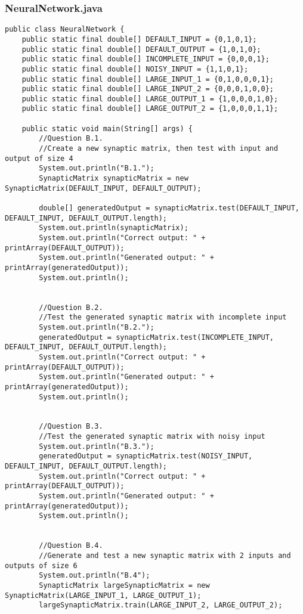 \documentclass{article}
\begin{document}
\subsubsection*{NeuralNetwork.java}
\begin{lstlisting}
public class NeuralNetwork {
	public static final double[] DEFAULT_INPUT = {0,1,0,1};
	public static final double[] DEFAULT_OUTPUT = {1,0,1,0};
	public static final double[] INCOMPLETE_INPUT = {0,0,0,1};
	public static final double[] NOISY_INPUT = {1,1,0,1};
	public static final double[] LARGE_INPUT_1 = {0,1,0,0,0,1};
	public static final double[] LARGE_INPUT_2 = {0,0,0,1,0,0};
	public static final double[] LARGE_OUTPUT_1 = {1,0,0,0,1,0};
	public static final double[] LARGE_OUTPUT_2 = {1,0,0,0,1,1};
	
	public static void main(String[] args) {
		//Question B.1.
		//Create a new synaptic matrix, then test with input and output of size 4
		System.out.println("B.1.");
		SynapticMatrix synapticMatrix = new SynapticMatrix(DEFAULT_INPUT, DEFAULT_OUTPUT);
		
		double[] generatedOutput = synapticMatrix.test(DEFAULT_INPUT, DEFAULT_INPUT, DEFAULT_OUTPUT.length);
		System.out.println(synapticMatrix);
		System.out.println("Correct output: " + printArray(DEFAULT_OUTPUT));
		System.out.println("Generated output: " + printArray(generatedOutput));
		System.out.println();
		

		//Question B.2.
		//Test the generated synaptic matrix with incomplete input
		System.out.println("B.2.");
		generatedOutput = synapticMatrix.test(INCOMPLETE_INPUT, DEFAULT_INPUT, DEFAULT_OUTPUT.length);
		System.out.println("Correct output: " + printArray(DEFAULT_OUTPUT));
		System.out.println("Generated output: " + printArray(generatedOutput));
		System.out.println();
		
		
		//Question B.3.
		//Test the generated synaptic matrix with noisy input
		System.out.println("B.3.");
		generatedOutput = synapticMatrix.test(NOISY_INPUT, DEFAULT_INPUT, DEFAULT_OUTPUT.length);
		System.out.println("Correct output: " + printArray(DEFAULT_OUTPUT));
		System.out.println("Generated output: " + printArray(generatedOutput));
		System.out.println();
		

		//Question B.4.
		//Generate and test a new synaptic matrix with 2 inputs and outputs of size 6
		System.out.println("B.4");
		SynapticMatrix largeSynapticMatrix = new SynapticMatrix(LARGE_INPUT_1, LARGE_OUTPUT_1);
		largeSynapticMatrix.train(LARGE_INPUT_2, LARGE_OUTPUT_2);
		

\end{lstlisting}
\end{document}
